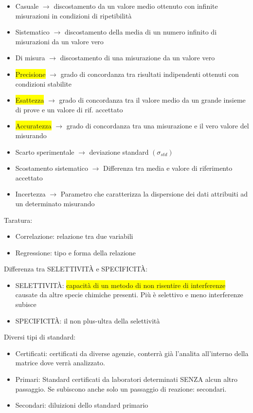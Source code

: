 \documentclass{article}
\begin{document}
\begin{itemize}
	\item Casuale $\rightarrow$ discostamento da un valore medio ottenuto con infinite misurazioni in condizioni di ripetibilità
	\item Sistematico $\rightarrow$ discostamento della media di un numero infinito di misurazioni da un valore vero 
	\item Di misura $\rightarrow$ discostamento di una misurazione da un valore vero
	\item \colorbox{yellow}{Precisione} $\rightarrow$ grado di concordanza tra risultati indipendenti ottenuti con condizioni stabilite
	\item \colorbox{yellow}{Esattezza} $\rightarrow$ grado di concordanza tra il valore medio da un grande insieme di prove e un valore di rif. accettato
	\item \colorbox{yellow}{Accuratezza} $\rightarrow$ grado di concordanza tra una misurazione e il vero valore del misurando 
	\item Scarto sperimentale $\rightarrow$ deviazione standard $(\sigma_{std})$
	\item Scostamento sistematico $\rightarrow$ Differenza tra media e valore di riferimento accettato
	\item Incertezza $\rightarrow$ Parametro che caratterizza la dispersione dei dati attribuiti ad un determinato misurando 
\end{itemize}
%
Taratura:
\begin{itemize}
	\item Correlazione: relazione tra due variabili
	\item Regressione: tipo e forma della relazione
\end{itemize}
%
Differenza tra SELETTIVITÀ e SPECIFICITÀ:
\begin{itemize}
	\item SELETTIVITÀ: \colorbox{yellow}{capacità di un metodo di non risentire di interferenze} causate da altre specie chimiche presenti. Più è selettivo e meno interferenze subisce
	\item SPECIFICITÀ: il non plus-ultra della selettività
\end{itemize}
%
Diversi tipi di standard:
\begin{itemize}
	\item Certificati: certificati da diverse agenzie, conterrà già l'analita all'interno della matrice dove verrà analizzato.
	\item Primari: Standard certificati da laboratori determinati SENZA alcun altro passaggio. Se subiscono anche solo un passaggio di reazione: secondari.
	\item Secondari: diluizioni dello standard primario
\end{itemize}
\end{document}
